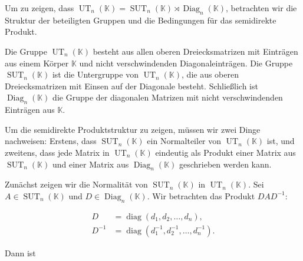 Um zu zeigen, dass $\operatorname{UT}_n(\mathbb{K}) = \operatorname{SUT}_n(\mathbb{K}) \rtimes \operatorname{Diag}_n(\mathbb{K})$, betrachten wir die Struktur der beteiligten Gruppen und die Bedingungen für das semidirekte Produkt.

Die Gruppe $\operatorname{UT}_n(\mathbb{K})$ besteht aus allen oberen Dreiecksmatrizen mit Einträgen aus einem Körper $\mathbb{K}$ und nicht verschwindenden Diagonaleinträgen. Die Gruppe $\operatorname{SUT}_n(\mathbb{K})$ ist die Untergruppe von $\operatorname{UT}_n(\mathbb{K})$, die aus oberen Dreiecksmatrizen mit Einsen auf der Diagonale besteht. Schließlich ist $\operatorname{Diag}_n(\mathbb{K})$ die Gruppe der diagonalen Matrizen mit nicht verschwindenden Einträgen aus $\mathbb{K}$.

Um die semidirekte Produktstruktur zu zeigen, müssen wir zwei Dinge nachweisen: Erstens, dass $\operatorname{SUT}_n(\mathbb{K})$ ein Normalteiler von $\operatorname{UT}_n(\mathbb{K})$ ist, und zweitens, dass jede Matrix in $\operatorname{UT}_n(\mathbb{K})$ eindeutig als Produkt einer Matrix aus $\operatorname{SUT}_n(\mathbb{K})$ und einer Matrix aus $\operatorname{Diag}_n(\mathbb{K})$ geschrieben werden kann.

Zunächst zeigen wir die Normalität von $\operatorname{SUT}_n(\mathbb{K})$ in $\operatorname{UT}_n(\mathbb{K})$. Sei $A \in \operatorname{SUT}_n(\mathbb{K})$ und $D \in \operatorname{Diag}_n(\mathbb{K})$. Wir betrachten das Produkt $DAD^{-1}$:

\begin{align*}
D &= \operatorname{diag}(d_1, d_2, \ldots, d_n), \\
D^{-1} &= \operatorname{diag}(d_1^{-1}, d_2^{-1}, \ldots, d_n^{-1}).
\end{align*}

Dann ist

